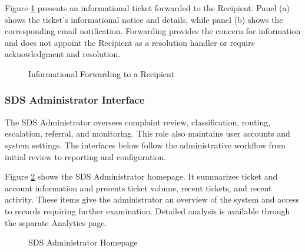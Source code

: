 Figure \ref{fig:info} presents an informational ticket forwarded to the Recipient. Panel (a) shows the ticket's informational notice and details, while panel (b) shows the corresponding email notification. Forwarding provides the concern for information and does not appoint the Recipient as a resolution handler or require acknowledgment and resolution.

\renewcommand{\thefigure}{5.19}
\begin{figure}[htbp]
    \centering
    \begin{minipage}[t]{0.43\linewidth}
        \centering
        \vspace{0pt}
        \par{}\par
    \end{minipage}\hspace{0.04\linewidth}
    \begin{minipage}[t]{0.43\linewidth}
        \centering
        \vspace{0pt}
        \par{}\par
    \end{minipage}
    \caption{Informational Forwarding to a Recipient}
    \label{fig:info}
\end{figure}
\FloatBarrier

\FloatBarrier
\subsubsection{SDS Administrator Interface}

The SDS Administrator oversees complaint review, classification, routing, escalation, referral, and monitoring. This role also maintains user accounts and system settings. The interfaces below follow the administrative workflow from initial review to reporting and configuration.

Figure \ref{fig:ahome} shows the SDS Administrator homepage. It summarizes ticket and account information and presents ticket volume, recent tickets, and recent activity. These items give the administrator an overview of the system and access to records requiring further examination. Detailed analysis is available through the separate Analytics page.

\renewcommand{\thefigure}{5.20}
\begin{figure}[htbp]
    \centering
    \caption{SDS Administrator Homepage}
    \label{fig:ahome}
\end{figure}
\FloatBarrier


